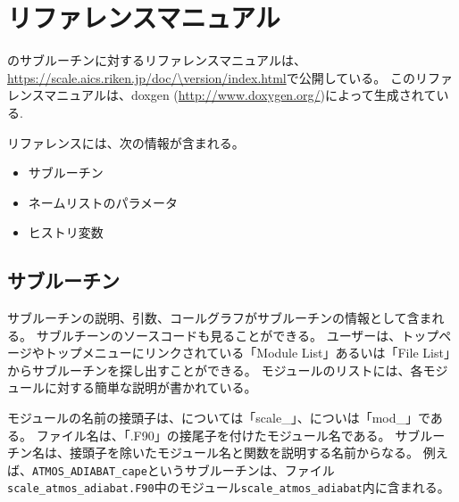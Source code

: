 \section{リファレンスマニュアル} \label{sec:reference_manual}
\scalelib のサブルーチンに対するリファレンスマニュアルは、\url{https://scale.aics.riken.jp/doc/\version/index.html}で公開している。
このリファレンスマニュアルは、doxgen (\url{http://www.doxygen.org/})によって生成されている.

リファレンスには、次の情報が含まれる。
\begin{itemize}
\item サブルーチン
\item ネームリストのパラメータ
\item ヒストリ変数
\end{itemize}


\subsection{サブルーチン}
サブルーチンの説明、引数、コールグラフがサブルーチンの情報として含まれる。
サブルチーンのソースコードも見ることができる。
ユーザーは、トップページやトップメニューにリンクされている「Module List」あるいは「File List」からサブルーチンを探し出すことができる。
モジュールのリストには、各モジュールに対する簡単な説明が書かれている。

モジュールの名前の接頭子は、\scalelib については「scale\_」、\scalerm についは「mod\_」である。
ファイル名は、「.F90」の接尾子を付けたモジュール名である。
サブルーチン名は、接頭子を除いたモジュール名と関数を説明する名前からなる。
例えば、\verb|ATMOS_ADIABAT_cape|というサブルーチンは、ファイル\verb|scale_atmos_adiabat.F90|中のモジュール\verb|scale_atmos_adiabat|内に含まれる。



